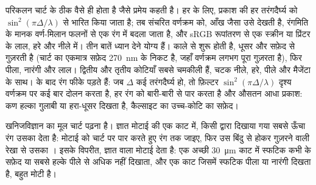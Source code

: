 परिकलन चार्ट के ठीक वैसे ही होता है जैसे प्रमेय कहती है। हर  के लिए, प्रकाश की हर तरंगदैर्घ्य को
$\sin^2(\pi\Delta/\lambda)$ से भारित किया जाता है; तब संचरित वर्णक्रम को, आँख जैसा उसे देखती है, रंगमिति के मानक
वर्ण-मिलान फलनों से एक रंग में बदला जाता है, और sRGB रूपांतरण से एक स्क्रीन या प्रिंटर के लाल, हरे और नीले में। तीन
बातें ध्यान देने योग्य हैं।  काले से शुरू होती है, धूसर और सफ़ेद से गुज़रती है (चार्ट का एकमात्र सफ़ेद \qty{270}{nm}
के निकट है, जहाँ वर्णक्रम लगभग पूरा गुज़रता है), फिर पीला, नारंगी और लाल। द्वितीय और तृतीय कोटियाँ सबसे चमकीली हैं, चटक
नीले, हरे, पीले और मैजेंटा के साथ।  के बाद रंग फीके पड़ते हैं: जब $\Delta$ कई तरंगदैर्घ्य हो, तो फ़िल्टर
$\sin^2(\pi\Delta/\lambda)$ दृश्य वर्णक्रम पर कई बार दोलन करता है, हर रंग को बारी-बारी से पार करता है और औसतन आधा प्रकाश:
कण हल्का गुलाबी या हरा-धूसर दिखता है, कैल्साइट का उच्च-कोटि का सफ़ेद।

खनिजविज्ञान का मूल चार्ट पढ़ना है। ज्ञात मोटाई की एक काट में, किसी  द्वारा दिखाया गया सबसे ऊँचा रंग उसका
 देता है: मोटाई को चार्ट पर पार करते हुए रंग तक जाइए, फिर उस बिंदु से होकर गुज़रने वाली रेखा से उसका
। इसके विपरीत, ज्ञात  वाला  मोटाई देता है: एक अच्छी \qty{30}{\micro m} काट में स्फटिक कभी
 के सफ़ेद या सबसे हल्के पीले से अधिक नहीं दिखाता, और एक काट जिसमें स्फटिक पीला या नारंगी दिखता है, बहुत मोटी है।

